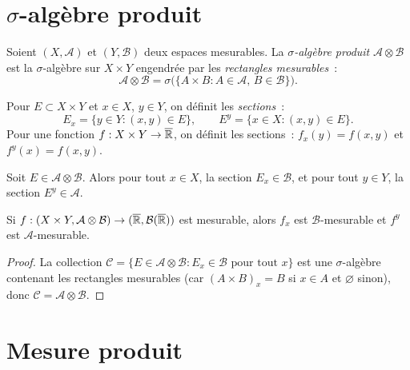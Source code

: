 \section{$\sigma$-alg\`ebre produit}

\begin{definition}
Soient $(X, \mathcal{A})$ et $(Y, \mathcal{B})$ deux espaces mesurables. La
\emph{$\sigma$-alg\`ebre produit}
$\mathcal{A} \otimes \mathcal{B}$ est la $\sigma$-alg\`ebre sur $X \times Y$
engendr\'ee par les \emph{rectangles mesurables}~:
\[
    \mathcal{A} \otimes \mathcal{B}
    = \sigma\bigl(\{A \times B : A \in \mathcal{A},\, B \in \mathcal{B}\}\bigr).
\]
\end{definition}

\begin{definition}[Sections]
Pour $E \subset X \times Y$ et $x \in X$, $y \in Y$, on d\'efinit les
\emph{sections}~:
\[
    E_x = \{y \in Y : (x,y) \in E\}, \qquad
    E^y = \{x \in X : (x,y) \in E\}.
\]
Pour une fonction $f : X \times Y \to \overline{\mathbb{R}}$, on d\'efinit les sections~:
$f_x(y) = f(x,y)$ et $f^y(x) = f(x,y)$.
\end{definition}

\begin{proposition}
\label{prop:sections_mesurables}
Soit $E \in \mathcal{A} \otimes \mathcal{B}$. Alors pour tout $x \in X$, la section
$E_x \in \mathcal{B}$, et pour tout $y \in Y$, la section $E^y \in \mathcal{A}$.

Si $f : (X \times Y, \mathcal{A} \otimes \mathcal{B}) \to (\overline{\mathbb{R}}, \mathcal{B}(\overline{\mathbb{R}}))$
est mesurable, alors $f_x$ est $\mathcal{B}$-mesurable et $f^y$ est
$\mathcal{A}$-mesurable.
\end{proposition}

\begin{proof}
La collection $\mathcal{C} = \{E \in \mathcal{A} \otimes \mathcal{B} : E_x \in \mathcal{B}
\text{ pour tout } x\}$ est une $\sigma$-alg\`ebre contenant les rectangles mesurables
(car $(A \times B)_x = B$ si $x \in A$ et $\varnothing$ sinon), donc
$\mathcal{C} = \mathcal{A} \otimes \mathcal{B}$.
\end{proof}

\section{Mesure produit}

